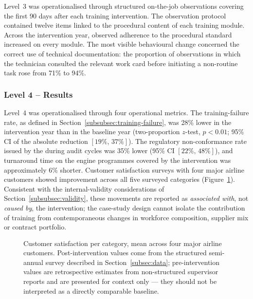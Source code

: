 Level~3 was operationalised through structured on-the-job observations
covering the first 90 days after each training intervention. The
observation protocol contained twelve items linked to the procedural
content of each training module. Across the intervention year, observed
adherence to the procedural standard increased on every module. The most
visible behavioural change concerned the correct use of technical
documentation: the proportion of observations in which the technician
consulted the relevant work card before initiating a non-routine task
rose from 71\% to 94\%.

\subsubsection{Level 4 -- Results}
\label{subsubsec:level4}

Level~4 was operationalised through four operational metrics. The
training-failure rate, as defined in
Section~\ref{subsubsec:training-failure}, was 28\% lower in the
intervention year than in the baseline year (two-proportion $z$-test,
$p < 0.01$; 95\% CI of the absolute reduction $[19\%,\,37\%]$).
The regulatory non-conformance rate issued by the \CAA{} during audit
cycles was 35\% lower (95\% CI $[22\%,\,48\%]$), and turnaround time on
the engine programmes covered by the intervention was approximately 6\%
shorter. Customer satisfaction surveys with four major airline customers
showed improvement across all five surveyed categories
(Figure~\ref{fig:customer-satisfaction}). Consistent with the
internal-validity considerations of Section~\ref{subsubsec:validity},
these movements are reported as \emph{associated with}, not
\emph{caused by}, the intervention; the case-study design cannot
isolate the contribution of training from contemporaneous changes in
workforce composition, supplier mix or contract portfolio.

\begin{figure}[!tbp]
  \centering
  
  \caption{Customer satisfaction per category, mean across four major
           airline customers. Post-intervention values come from the
           structured semi-annual survey described in
           Section~\ref{subsec:data}; pre-intervention values are
           retrospective estimates from non-structured supervisor reports
           and are presented for context only --- they should not be
           interpreted as a directly comparable baseline.}
  \label{fig:customer-satisfaction}
\end{figure}

